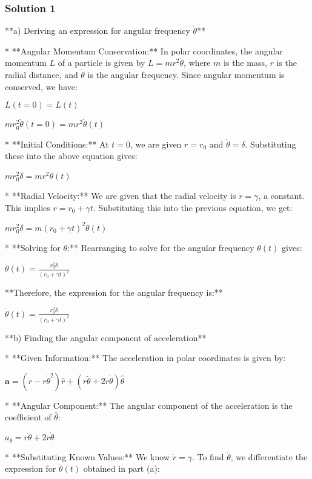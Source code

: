 \documentclass{article}
\begin{document}
\subsubsection{Solution 1}
**a) Deriving an expression for angular frequency $\dot{\theta}$**

* **Angular Momentum Conservation:** In polar coordinates, the angular momentum $L$ of a particle is given by $L = mr^2\dot{\theta}$, where $m$ is the mass, $r$ is the radial distance, and $\dot{\theta}$ is the angular frequency. Since angular momentum is conserved, we have:

   $L(t = 0) = L(t)$

   $mr_0^2 \dot{\theta}(t=0) = mr^2 \dot{\theta}(t)$

* **Initial Conditions:** At $t=0$, we are given $r = r_0$ and $\dot{\theta} = \delta$.  Substituting these into the above equation gives:

   $mr_0^2 \delta = mr^2 \dot{\theta}(t)$

* **Radial Velocity:** We are given that the radial velocity is $\dot{r} = \gamma$, a constant. This implies $r = r_0 + \gamma t$. Substituting this into the previous equation, we get:

   $mr_0^2 \delta = m(r_0 + \gamma t)^2 \dot{\theta}(t)$

* **Solving for $\dot{\theta}$:**  Rearranging to solve for the angular frequency $\dot{\theta}(t)$ gives:

   $\dot{\theta}(t) = \frac{r_0^2 \delta}{(r_0 + \gamma t)^2}$

**Therefore, the expression for the angular frequency is:**

$\boxed{\dot{\theta}(t) = \frac{r_0^2 \delta}{(r_0 + \gamma t)^2}}$


**b) Finding the angular component of acceleration**

* **Given Information:** The acceleration in polar coordinates is given by:

   $\mathbf{a} = (\ddot{r} - r\dot{\theta}^2)\hat{r} + (r\ddot{\theta} + 2\dot{r}\dot{\theta})\hat{\theta}$

* **Angular Component:** The angular component of the acceleration is the coefficient of $\hat{\theta}$:

   $a_\theta = r\ddot{\theta} + 2\dot{r}\dot{\theta}$

* **Substituting Known Values:** We know $\dot{r} = \gamma$. To find $\ddot{\theta}$, we differentiate the expression for $\dot{\theta}(t)$ obtained in part (a):
\end{document}
